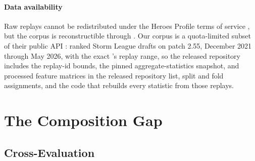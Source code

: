 \documentclass[journal]{IEEEtran}
\providecommand{\DIFaddtex}[1]{{\protect\color{blue} \sf #1}} %
\providecommand{\DIFdeltex}[1]{{\protect\color{red} \scriptsize #1}} %
\providecommand{\DIFaddbegin}{} %
\providecommand{\DIFaddend}{} %
\providecommand{\DIFdelbegin}{} %
\providecommand{\DIFdelend}{} %
\providecommand{\DIFadd}[1]{\texorpdfstring{\DIFaddtex{#1}}{#1}} %
\providecommand{\DIFdel}[1]{\texorpdfstring{\DIFdeltex{#1}}{}} %
\begin{document}
\paragraph{Data availability} Raw replays cannot be redistributed under the Heroes Profile terms of service\DIFdelbegin \DIFdel{, but the corpus is reconstructible through }\DIFdelend \DIFaddbegin \DIFadd{. Our corpus is a quota-limited subset of }\DIFaddend their public API\DIFdelbegin \DIFdel{: ranked Storm League drafts on patch 2.55, December 2021 through May 2026, with the exact }\DIFdelend \DIFaddbegin \DIFadd{'s replay range, so the released repository includes the }\DIFaddend replay-id \DIFdelbegin \DIFdel{bounds, the pinned aggregate-statistics snapshot, and processed feature matrices in the released repository}\DIFdelend \DIFaddbegin \DIFadd{list, split and fold assignments, and the code that rebuilds every statistic from those replays}\DIFaddend .

\section{The Composition Gap}
\label{sec:gap}

\DIFdelbegin \subsection{\DIFdel{Cross-Evaluation}}
\addtocounter{subsection}{-1}%
\end{document}
